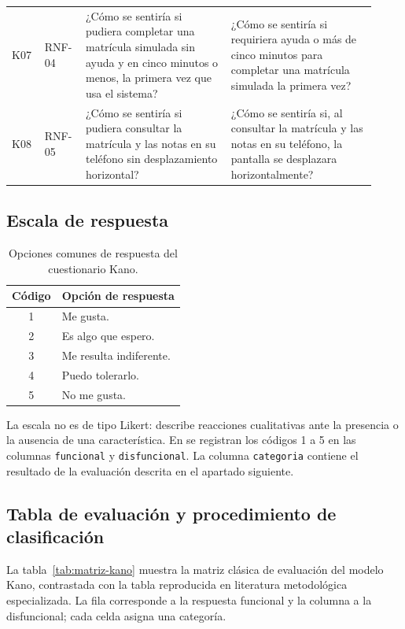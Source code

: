\begin{longtable}{@{}p{0.08\linewidth}p{0.10\linewidth}p{0.37\linewidth}p{0.37\linewidth}@{}}
K07 & RNF-04 & ¿Cómo se sentiría si pudiera completar una matrícula simulada sin ayuda y en cinco minutos o menos, la primera vez que usa el sistema? & ¿Cómo se sentiría si requiriera ayuda o más de cinco minutos para completar una matrícula simulada la primera vez? \\
K08 & RNF-05 & ¿Cómo se sentiría si pudiera consultar la matrícula y las notas en su teléfono sin desplazamiento horizontal? & ¿Cómo se sentiría si, al consultar la matrícula y las notas en su teléfono, la pantalla se desplazara horizontalmente? \\
\end{longtable}
\endgroup

\subsection{Escala de respuesta}
\label{subsec:escala-kano}

\begin{table}[htbp]
\centering
\caption{Opciones comunes de respuesta del cuestionario Kano.}
\label{tab:escala-kano}
\renewcommand{\arraystretch}{1.15}
\begin{tabular}{@{}cl@{}}
\toprule
Código & Opción de respuesta \\
\midrule
1 & Me gusta. \\
2 & Es algo que espero. \\
3 & Me resulta indiferente. \\
4 & Puedo tolerarlo. \\
5 & No me gusta. \\
\bottomrule
\end{tabular}
\end{table}

La escala no es de tipo Likert: describe reacciones cualitativas ante la presencia o la ausencia de una característica. En  se registran los códigos 1 a 5 en las columnas \texttt{funcional} y \texttt{disfuncional}. La columna \texttt{categoria} contiene el resultado de la evaluación descrita en el apartado siguiente.

\subsection{Tabla de evaluación y procedimiento de clasificación}
\label{subsec:clasificacion-kano}

La tabla~\ref{tab:matriz-kano} muestra la matriz clásica de evaluación del modelo Kano, contrastada con la tabla reproducida en literatura metodológica especializada. La fila corresponde a la respuesta funcional y la columna a la disfuncional; cada celda asigna una categoría.

